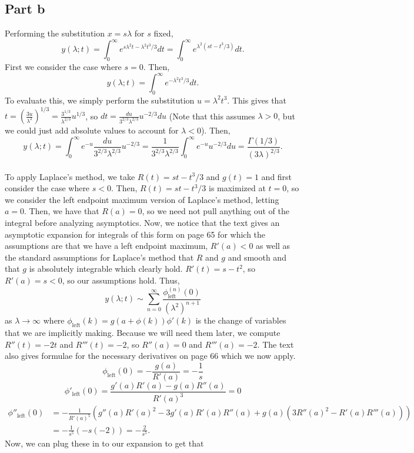 \documentclass{article}
\begin{document}
\subsection{Part b}
Performing the substitution $x=s\lambda$ for $s$ fixed, 
\[
y(\lambda;t)=\int_0^\infty e^{s\lambda^2 t-\lambda^2t^3/3}dt=\int_0^\infty e^{\lambda^2(st-t^3/3)}dt.
\]
First we consider the case where $s=0$. Then, 
\[
y(\lambda;t)=\int_0^\infty e^{-\lambda^2t^3/3}dt.
\]
To evaluate this, we simply perform the substitution $u=\lambda^2t^3$. This gives that $t=\left(\frac{3u}{\lambda^2}\right)^{1/3}=\frac{3^{1/3}}{\lambda^{2/3}}u^{1/3}$, so $dt=\frac{du}{3^{2/3}\lambda^{2/3}}u^{-2/3}du$ (Note that this assumes $\lambda>0$, but we could just add absolute values to account for $\lambda<0$). Then,
\[
y(\lambda;t)=\int_0^\infty e^{-u}\frac{du}{3^{2/3}\lambda^{2/3}}u^{-2/3}=\frac{1}{3^{2/3}\lambda^{2/3}}\int_0^\infty e^{-u}u^{-2/3}du=\frac{\Gamma(1/3)}{(3\lambda)^{2/3}}.
\]
\\
To apply Laplace's method, we take $R(t)=st-t^3/3$ and $g(t)=1$ and first consider the case where $s<0$. Then, $R(t)=st-t^3/3$ is maximized at $t=0$, so we consider the left endpoint maximum version of Laplace's method, letting $a=0$. Then, we have that $R(a)=0$, so we need not pull anything out of the integral before analyzing asymptotics. Now, we notice that the text gives an asymptotic expansion for integrals of this form on page 65 for which the assumptions are that we have a left endpoint maximum, $R'(a)<0$ as well as the standard assumptions for Laplace's method that $R$ and $g$ and smooth and that $g$ is absolutely integrable which clearly hold. $R'(t)=s-t^2$, so $R'(a)=s<0$, so our assumptions hold. Thus,
\[
y(\lambda;t)\sim\sum_{n=0}^\infty\frac{\phi_{\text{left}}^{(n)}(0)}{(\lambda^2)^{n+1}}
\]
as $\lambda\to\infty$ where $\phi_{\text{left}}(k)=g(a+\phi(k))\phi'(k)$ is the change of variables that we are implicitly making. Because we will need them later, we compute $R''(t)=-2t$ and $R'''(t)=-2$, so $R''(a)=0$ and $R'''(a)=-2$. The text also gives formulae for the necessary derivatives on page 66 which we now apply. 
\[
\phi_{\text{left}}(0)=-\frac{g(a)}{R'(a)}=-\frac{1}{s}
\]
\[
\phi'_{\text{left}}(0)=\frac{g'(a)R'(a)-g(a)R''(a)}{R'(a)^3}=0
\]
\begin{align*}
\phi''_{\text{left}}(0)&=-\frac{1}{R'(a)^5}\left(g''(a)R'(a)^2-3g'(a)R'(a)R''(a)+g(a)(3R''(a)^2-R'(a)R'''(a))\right)\\&=
-\frac{1}{s^5}(-s(-2))=-\frac{2}{s^5}.
\end{align*}
Now, we can plug these in to our expansion to get that 
\end{document}
